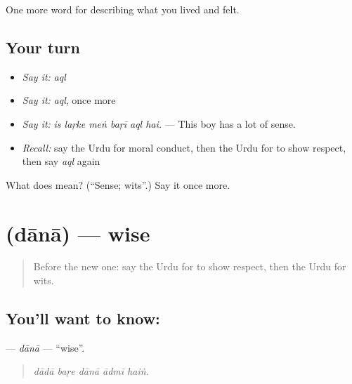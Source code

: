 \begin{grammarlens}[title={What you've built}]
One more word for describing what you lived and felt.
\end{grammarlens}

\subsection*{Your turn}
\begin{itemize}
\raggedright
  \item \emph{Say it:} \emph{aql}
  \item \emph{Say it:} \emph{aql}, once more
  \item \emph{Say it:} \emph{is laṛke meṅ baṛī aql hai.} — This boy has a lot of sense.
  \item \emph{Recall:} say the Urdu for moral conduct, then the Urdu for to show respect, then say \emph{aql} again
\end{itemize}

\begin{tcolorbox}[breakable,colback=teal!4,colframe=teal!35!black,title={Before you move on}]
What does  mean? (\textquotedblleft{}Sense; wits\textquotedblright{}.) Say it once more.
\end{tcolorbox}
\section[\texorpdfstring{\ur{دانا} (dānā)}{دانا (dānā)}]{ (dānā) — wise}

\label{lesson:UR-C462-dana}



\begin{quote}
Before the new one: say the Urdu for to show respect, then the Urdu for wits.
\end{quote}

\subsection*{You'll want to know: }
\textbf{} — \emph{dānā} — \textquotedblleft{}wise\textquotedblright{}.

\begin{quote}
    
\end{quote}

\begin{quote}
\emph{dādā baṛe dānā ādmī haiṅ.}
\end{quote}

